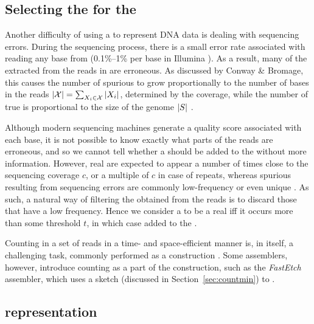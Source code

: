 \subsection{Selecting the  for the \dBG}
\label{subsec:dBG-selectingkmers}

Another difficulty of using a \dBG to represent DNA data is dealing with sequencing errors. During the sequencing process, there is a small error rate associated with reading any base from  (0.1\%--1\% per base in Illumina \cite{Metzker2010}). As a result, many of the  extracted from the reads in \readset are erroneous. As discussed by Conway \& Bromage, this causes the number of spurious  to grow proportionally to the number of bases in the reads $|\readset|=\sum_{\strname{X}_i \in \readset} |\strname{X}_i|$, determined by the coverage, while the number of true  is proportional to the size of the genome $|\strname{S}|$ \cite{Conway2011}.

Although modern sequencing machines generate a quality score associated with each base, it is not possible to know exactly what parts of the reads are erroneous, and so we cannot tell whether a \kmer should be added to the \dBG without more information. However, real  are expected to appear a number of times close to the sequencing coverage $c$, or a multiple of $c$ in case of repeats, whereas spurious  resulting from sequencing errors are commonly low-frequency or even unique \cite{Conway2011} \cite{Zhang2014} \cite{Ghosh2019}. As such, a natural way of filtering the  obtained from the reads is to discard those that have a low frequency. Hence we consider a \kmer to be a real \kmer iff it occurs more than some threshold $t$, in which case added to the \dBG.

Counting  in a set of reads in a time- and space-efficient manner is, in itself, a challenging task,  commonly performed as a  \dBG construction \cite{Zhang2014}. Some assemblers, however, introduce \kmer counting as a part of the \dBG construction, such as the \emph{FastEtch} assembler, which uses a \cm sketch (discussed in Section~\ref{sec:countmin}) to  \cite{Ghosh2019}.

\subsection{\dBG representation}
\label{subsec:dBG-representation}

